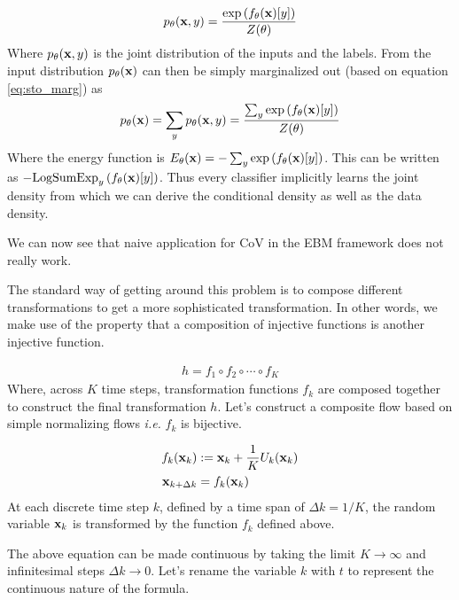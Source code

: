 \documentclass[a4paper, 11pt]{article}
\begin{document}
\begin{align}
    p_\theta(\mbox{$\mbox{$\mathbf{x}$}$} , y) = \frac{\exp\left (f_\theta(\mbox{$\mbox{$\mathbf{x}$}$})[y]  \right )}{Z(\theta)}
\end{align}
Where $p_\theta(\mbox{$\mbox{$\mathbf{x}$}$} , y)$ is the joint distribution of the inputs and the labels. From the input distribution $p_\theta(\mbox{$\mbox{$\mathbf{x}$}$})$ can then be simply marginalized out (based on equation \eqref{eq:sto_marg}) as
\begin{align}
    p_\theta(\mbox{$\mbox{$\mathbf{x}$}$}) = \sum_y p_\theta(\mbox{$\mbox{$\mathbf{x}$}$} , y) = \frac{\sum_y\exp\left (f_\theta(\mbox{$\mbox{$\mathbf{x}$}$})[y]  \right )}{Z(\theta)}
\end{align}
Where the energy function is $E_\theta(\mbox{$\mbox{$\mathbf{x}$}$}) = - \sum_y\exp\left (f_\theta(\mbox{$\mbox{$\mathbf{x}$}$})[y]  \right )$. This can be written as $-\text{LogSumExp}_y \left (f_\theta(\mbox{$\mbox{$\mathbf{x}$}$})[y]  \right )$. Thus every classifier implicitly learns  the joint density from which we can derive the conditional density as well as the data density.

We can now see that naive application for CoV in the EBM framework does not really work.

The standard way of getting around this problem is to compose different transformations to get a more sophisticated transformation. In other words, we make use of the property that a composition of injective functions is another injective function. 

\begin{align}
    h = f_1 \circ f_2 \circ  \cdots \circ f_K
\end{align}
Where, across $K$ time steps, transformation functions $f_k$ are composed together to construct the final transformation $h$. Let's construct a composite flow based on simple normalizing flows \textit{i.e.} $f_k$ is bijective.

\begin{align}\label{eq:res_flow}
    f_k(\mbox{$\mbox{$\mathbf{x}$}$}_k) &:= \mbox{$\mbox{$\mathbf{x}$}$}_k + \frac{1}{K}U_k(\mbox{$\mbox{$\mathbf{x}$}$}_k) \\
    \mbox{$\mbox{$\mathbf{x}$}$}_{k + \Delta k} &= f_k(\mbox{$\mbox{$\mathbf{x}$}$}_k)
\end{align}
At each discrete time step $k$, defined by a time span of $\Delta k = 1/K$, the random variable $\mbox{$\mbox{$\mathbf{x}$}$}_k$ is transformed by the function $f_k$ defined above.

The above equation can be made continuous by taking the limit $K \to \infty$ and infinitesimal steps $\Delta k \to 0$. Let's rename the variable $k$ with $t$ to represent the continuous nature of the formula.
\end{document}

